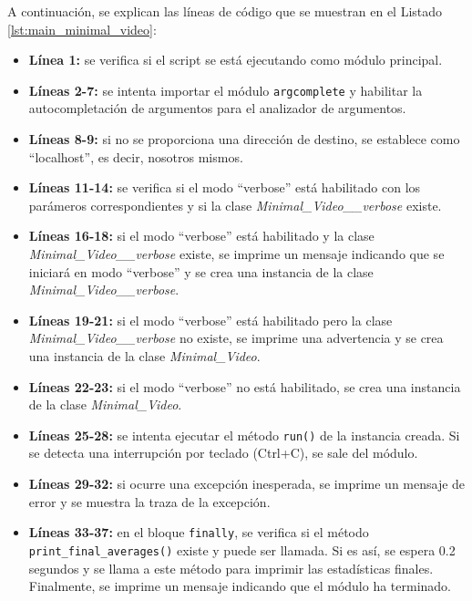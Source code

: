 A continuación, se explican las líneas de código que se muestran en el Listado \ref{lst:main_minimal_video}:
\begin{itemize}
    \item \textbf{Línea 1:} se verifica si el script se está ejecutando como módulo principal.
    \item \textbf{Líneas 2-7:} se intenta importar el módulo \texttt{argcomplete} y habilitar la autocompletación de argumentos para el analizador de argumentos.
    \item \textbf{Líneas 8-9:} si no se proporciona una dirección de destino, se establece como ``localhost'', es decir, nosotros mismos.
    \item \textbf{Líneas 11-14:} se verifica si el modo ``verbose'' está habilitado con los parámeros correspondientes y si la clase \textit{Minimal\_Video\_\_verbose} existe.
    \item \textbf{Líneas 16-18:} si el modo ``verbose'' está habilitado y la clase \textit{Minimal\_Video\_\_verbose} existe, se imprime un mensaje indicando que se iniciará en modo ``verbose'' y se crea una instancia de la clase \textit{Minimal\_Video\_\_verbose}.
    \item \textbf{Líneas 19-21:} si el modo ``verbose'' está habilitado pero la clase \textit{Minimal\_Video\_\_verbose} no existe, se imprime una advertencia y se crea una instancia de la clase \textit{Minimal\_Video}.
    \item \textbf{Líneas 22-23:} si el modo ``verbose'' no está habilitado, se crea una instancia de la clase \textit{Minimal\_Video}.
    \item \textbf{Líneas 25-28:} se intenta ejecutar el método \texttt{run()} de la instancia creada. Si se detecta una interrupción por teclado (Ctrl+C), se sale del módulo.
    \item \textbf{Líneas 29-32:} si ocurre una excepción inesperada, se imprime un mensaje de error y se muestra la traza de la excepción.
    \item \textbf{Líneas 33-37:} en el bloque \texttt{finally}, se verifica si el método \texttt{print\_final\_averages()} existe y puede ser llamada. Si es así, se espera 0.2 segundos y se llama a este método para imprimir las estadísticas finales. Finalmente, se imprime un mensaje indicando que el módulo ha terminado.
\end{itemize}
\vspace{\baselineskip}

\newpage

